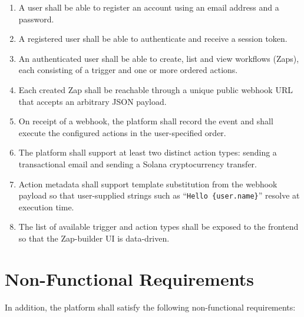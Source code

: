 \begin{enumerate}[label=FR-\arabic*., leftmargin=*]
\item A user shall be able to register an account using an email address and a password.
\item A registered user shall be able to authenticate and receive a session token.
\item An authenticated user shall be able to create, list and view workflows (Zaps), each consisting of a trigger and one or more ordered actions.
\item Each created Zap shall be reachable through a unique public webhook URL that accepts an arbitrary JSON payload.
\item On receipt of a webhook, the platform shall record the event and shall execute the configured actions in the user-specified order.
\item The platform shall support at least two distinct action types: sending a transactional email and sending a Solana cryptocurrency transfer.
\item Action metadata shall support template substitution from the webhook payload so that user-supplied strings such as ``\texttt{Hello \{user.name\}}'' resolve at execution time.
\item The list of available trigger and action types shall be exposed to the frontend so that the Zap-builder UI is data-driven.
\end{enumerate}

\section{Non-Functional Requirements}

In addition, the platform shall satisfy the following non-functional requirements:

